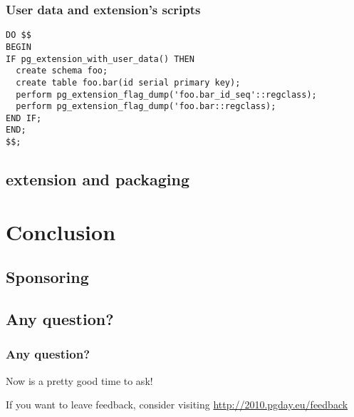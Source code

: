 \documentclass[english]{beamer}
\begin{document}

\begin{frame}[fragile]
  \frametitle{User data and extension's scripts}

  \begin{example}
\begin{verbatim}
DO $$
BEGIN
IF pg_extension_with_user_data() THEN
  create schema foo;
  create table foo.bar(id serial primary key);
  perform pg_extension_flag_dump('foo.bar_id_seq'::regclass);
  perform pg_extension_flag_dump('foo.bar::regclass);
END IF;
END;
$$;
\end{verbatim}
  \end{example}
\end{frame}

\subsection{extension and packaging}


\section{Conclusion}

\subsection{Sponsoring}


\subsection{Any question?}

\begin{frame}[fragile]
  \frametitle{Any question?}

  \begin{center}
    Now is a pretty good time to ask!
  \end{center}

  \linebreak
  \begin{center}
    If you want to leave feedback, consider visiting
    \url{http://2010.pgday.eu/feedback}
  \end{center}
\end{frame}
\end{document}
